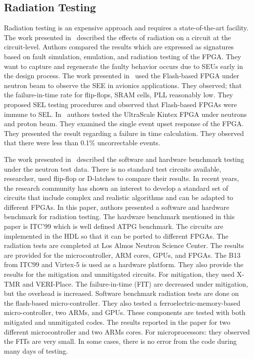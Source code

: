 \subsection{Radiation Testing}
Radiation testing is an expensive approach and requires a state-of-the-art facility. The work presented in~\cite{hobeika2014multi} described the effects of radiation on a circuit at the circuit-level. Authors compared the results which are expressed as signatures based on fault simulation, emulation, and radiation testing of the FPGA. They want to capture and regenerate the faulty behavior occurs due to SEUs early in the design process. 
The work presented in~\citep{dsilva2015neutron} used the Flash-based FPGA under neutron beam to observe the SEE in avionics applications. They observed;  that the failure-in-time rate for flip-flops, SRAM cells, PLL reasonably low. They proposed SEL testing procedures and observed that Flash-based FPGAs were immune to SEL. 
In~\citep{maillard2015neutron} authors tested the UltraScale Kintex FPGA under neutrons and proton beam. They examined the single event upset response of the FPGA. They presented the result regarding a failure in time calculation. They observed that there were less than 0.1\% uncorrectable events. 

The work presented in~\citep{quinn2015using} described the software and hardware benchmark testing under the neutron test data. There is no standard test circuits available, researcher, used flip-flop or D-latches to compare their results. In recent years,  the research community has shown an interest to develop a standard set of circuits that include complex and realistic algorithms and can be adapted to different FPGAs. In this paper, authors presented a software and hardware benchmark for radiation testing. 
The hardware benchmark mentioned in this paper is ITC'99 which is well defined ATPG benchmark. The circuits are implemented in the HDL so that it can be ported to different FPGAs.  The radiation tests are completed at Los Almos Neutron Science
Center. The results are provided for the microcontroller, ARM cores, GPUs, and
FPGAs. The B13 from ITC99 and Virtex-5 is used
as a hardware platform. They also provide the results for the mitigation and unmitigated circuits. For mitigation, they
used X-TMR and VERI-Place. The failure-in-time (FIT) are decreased under mitigation,
but the overhead is increased.
Software benchmark radiation tests are done on the flash-based micro-controller. They also tested a ferroelectric-memory-based micro-controller, two ARMs, and GPUs. These components are tested with both mitigated and unmitigated codes. The results reported in the paper for two different microcontroller and two ARMs cores. For microprocessors: they observed the FITs are very small. In some cases, there is no error from the code during many days of testing. 



